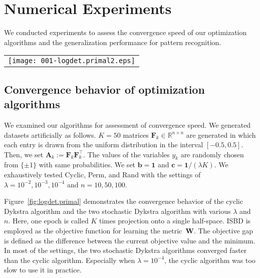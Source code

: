 \documentclass[10pt,onecolumn]{article}
\theoremstyle{definition}
\theoremstyle{definition}
\theoremstyle{definition}
\theoremstyle{definition}
\theoremstyle{definition}
\theoremstyle{theorem}
\newcommand{\0}{{\bm{0}}}
\newcommand{\1}{{\bm{1}}}
\newcommand{\vb}{{\bm{b}}}
\newcommand{\vc}{{\bm{c}}}
\newcommand{\vA}{{\bm{A}}}
\newcommand{\vF}{{\bm{F}}}
\newcommand{\bR}{{\mathbb{R}}}
\newcommand{\vW}{{\bm{W}}}
\begin{document}
\section{Numerical Experiments}

We conducted experiments to assess the convergence speed of
our optimization algorithms and the generalization
performance for pattern recognition.

\begin{figure*}[t!]
\begin{center}
\begin{tabular}{l}
\texttt{[image: 001-logdet.primal2.eps]}
\end{tabular}
\end{center}
\caption{Convergence behavior of the algorithms using different settings. \label{fig:logdet.primal}}
\end{figure*}

\subsection{Convergence behavior of optimization algorithms}
%
We examined our algorithms for assessment of convergence
speed. We generated datasets artificially as follows. $K=50$
matrices $\vF_{k}\in\bR^{n\times n}$ are generated in which
each entry is drawn from the uniform distribution in the
interval $[-0.5,0.5]$. Then, we set
$\vA_{k}:=\vF_{k}\vF_{k}^\top$. The values of the variables
$y_{k}$ are randomly chosen from $\{\pm 1\}$ with same
probabilities. We set $\vb=\1$ and $\vc=\1/(\lambda K)$. We
exhaustively tested Cyclic, Perm, and Rand with the settings
of $\lambda=10^{-2},10^{-3},10^{-4}$ and $n=10,50,100$.

Figure~\ref{fig:logdet.primal}
demonstrates the convergence behavior of the
cyclic Dykstra algorithm and the two stochastic Dykstra
algorithm with various $\lambda$ and $n$. Here, one epoch is
called $K$ times projection onto a single half-space.
ISBD is employed as the objective function for learning the metric~$\vW$. 
The
objective gap is defined as the difference between the
current objective value and the minimum. In most of the
settings, the two stochastic Dykstra algorithms converged
faster than the cyclic algorithm. Especially when
$\lambda=10^{-4}$, the cyclic algorithm was too slow to use
it in practice.
\end{document}
